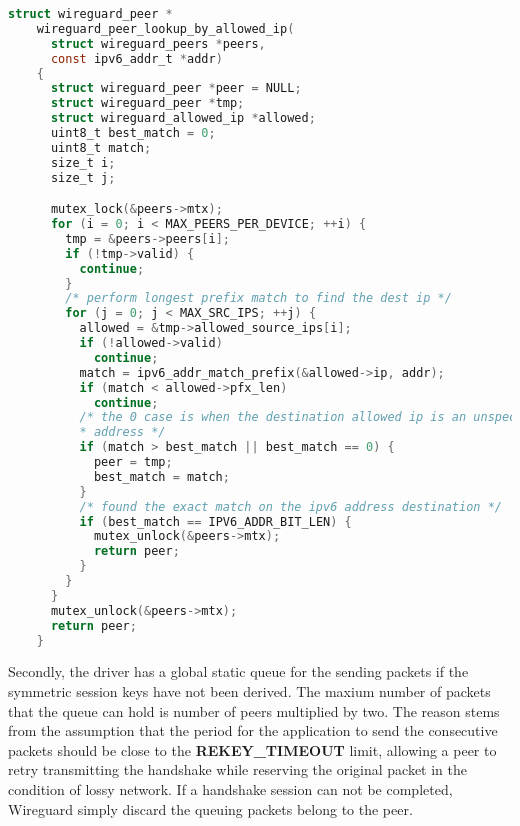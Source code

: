   \begin{lstlisting}[caption = Allowed IP address lookup,language=C, label={lst:allowedip}]
    struct wireguard_peer *
    wireguard_peer_lookup_by_allowed_ip(
      struct wireguard_peers *peers,
      const ipv6_addr_t *addr) 
    {
      struct wireguard_peer *peer = NULL;
      struct wireguard_peer *tmp;
      struct wireguard_allowed_ip *allowed;
      uint8_t best_match = 0;
      uint8_t match;
      size_t i;
      size_t j;

      mutex_lock(&peers->mtx);
      for (i = 0; i < MAX_PEERS_PER_DEVICE; ++i) {
        tmp = &peers->peers[i];
        if (!tmp->valid) {
          continue;
        }
        /* perform longest prefix match to find the dest ip */
        for (j = 0; j < MAX_SRC_IPS; ++j) {
          allowed = &tmp->allowed_source_ips[i];
          if (!allowed->valid)
            continue;
          match = ipv6_addr_match_prefix(&allowed->ip, addr);
          if (match < allowed->pfx_len)
            continue;
          /* the 0 case is when the destination allowed ip is an unspecified IPv6
          * address */
          if (match > best_match || best_match == 0) {
            peer = tmp;
            best_match = match;
          }
          /* found the exact match on the ipv6 address destination */
          if (best_match == IPV6_ADDR_BIT_LEN) {
            mutex_unlock(&peers->mtx);
            return peer;
          }
        }
      }
      mutex_unlock(&peers->mtx);
      return peer;
    }
  \end{lstlisting}

  Secondly, the driver has a global static queue for the sending packets 
  if the symmetric session keys have not been derived. The maxium number of packets that
  the queue can hold is number of peers multiplied by two. The reason stems from the assumption
  that the period for the application to send the consecutive packets should be close to the 
  \textbf{REKEY{\_}TIMEOUT} limit, allowing a peer to retry transmitting the handshake
  while reserving the original packet in the condition of lossy network. If a handshake 
  session can not be completed, Wireguard simply discard the queuing packets belong
  to the peer.

